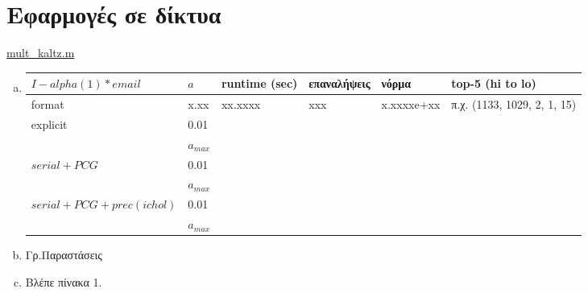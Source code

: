 \documentclass{article}
\begin{document}
\section{Εφαρμογές σε δίκτυα}
\href{run:./mult_kaltz.m}{mult\_kaltz.m}
\begin{enumerate}[a.]
    \item 
    \begin{tabular}{ |p{4.5cm} p{1cm}||p{1.5cm}|p{2cm}|p{1.5cm}|p{3.5cm}|}
        \hline
        $I-alpha(1)*email$ & $a$ & runtime (sec) & επαναλήψεις & νόρμα & top-5 (hi to lo)\\
        \hline
        format & x.xx & xx.xxxx & xxx & x.xxxxe+xx & π.χ. (1133, 1029, 2, 1, 15)\\
        \hline
        \hline
        explicit & 0.01&&&&\\
        \hline
        & $a_{max}$ &&&&\\
        \hline
        \hline
        $serial+PCG$ & 0.01 &&&&\\
        \hline
        & $a_{max}$ &&&&\\
        \hline
        \hline
        $serial+PCG+prec(ichol)$ & 0.01 &&&&\\
        \hline
        & $a_{max}$ &&&&\\
        \hline
       \end{tabular}

    \item Γρ.Παραστάσεις
    \item Βλέπε πίνακα 1.
\end{enumerate}
\end{document}
